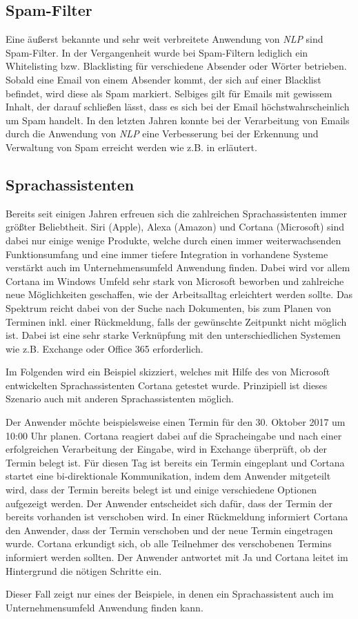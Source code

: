 \subsection{Spam-Filter}
Eine äußerst bekannte und sehr weit verbreitete Anwendung von \textit{NLP} sind Spam-Filter. In der Vergangenheit wurde bei Spam-Filtern lediglich ein Whitelisting bzw. Blacklisting für verschiedene Absender oder Wörter betrieben. Sobald eine Email von einem Absender kommt, der sich auf einer Blacklist befindet, wird diese als Spam markiert. Selbiges gilt für Emails mit gewissem Inhalt, der darauf schließen lässt, dass es sich bei der Email höchstwahrscheinlich um Spam handelt. In den letzten Jahren konnte bei der Verarbeitung von Emails durch die Anwendung von \textit{NLP} eine Verbesserung bei der Erkennung und Verwaltung von Spam erreicht werden wie z.B. in \cite{Rohit2014} erläutert. 

\subsection{Sprachassistenten}
Bereits seit einigen Jahren erfreuen sich die zahlreichen Sprachassistenten immer größter Beliebtheit. Siri (Apple), Alexa (Amazon) und Cortana (Microsoft) sind dabei nur einige wenige Produkte, welche durch einen immer weiterwachsenden Funktionsumfang und eine immer tiefere Integration in vorhandene Systeme verstärkt auch im Unternehmensumfeld Anwendung finden. Dabei wird vor allem Cortana im Windows Umfeld sehr stark von Microsoft beworben und zahlreiche neue Möglichkeiten geschaffen, wie der Arbeitsalltag erleichtert werden sollte. Das Spektrum reicht dabei von der Suche nach Dokumenten, bis zum Planen von Terminen inkl. einer Rückmeldung, falls der gewünschte Zeitpunkt nicht möglich ist. Dabei ist eine sehr starke Verknüpfung mit den unterschiedlichen Systemen wie z.B. Exchange oder Office 365 erforderlich. 

Im Folgenden wird ein Beispiel skizziert, welches mit Hilfe des von Microsoft entwickelten Sprachassistenten Cortana getestet wurde. Prinzipiell ist dieses Szenario auch mit anderen Sprachassistenten möglich.

Der Anwender möchte beispielsweise einen Termin für den 30. Oktober 2017 um 10:00 Uhr planen. Cortana reagiert dabei auf die Spracheingabe und nach einer erfolgreichen Verarbeitung der Eingabe, wird in Exchange überprüft, ob der Termin belegt ist. Für diesen Tag ist bereits ein Termin eingeplant und Cortana startet eine bi-direktionale Kommunikation, indem dem Anwender mitgeteilt wird, dass der Termin bereits belegt ist und einige verschiedene Optionen aufgezeigt werden. Der Anwender entscheidet sich dafür, dass der Termin der bereits vorhanden ist verschoben wird. In einer Rückmeldung informiert Cortana den Anwender, dass der Termin verschoben und der neue Termin eingetragen wurde. Cortana erkundigt sich, ob alle Teilnehmer des verschobenen Termins informiert werden sollten. Der Anwender antwortet mit Ja und Cortana leitet im Hintergrund die nötigen Schritte ein.

Dieser Fall zeigt nur eines der Beispiele, in denen ein Sprachassistent auch im Unternehmensumfeld Anwendung finden kann. 



